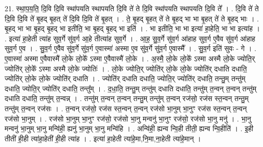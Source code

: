 \documentclass[17pt]{extarticle}
\begin{document}
21. स्था॒प॒य॒ति॒ दि॒वि दि॒वि स्था॑पयति स्थापयति दि॒वि ते॑ ते दि॒वि स्था॑पयति स्थापयति दि॒वि ते᳚ । . दि॒वि ते॑ ते दि॒वि दि॒वि ते॑ बृ॒हद् बृ॒हत् ते॑ दि॒वि दि॒वि ते॑ बृ॒हत् । . ते॒ बृ॒हद् बृ॒हत् ते॑ ते बृ॒हद् भा भा बृ॒हत् ते॑ ते बृ॒हद् भाः । . बृ॒हद् भा भा बृ॒हद् बृ॒हद् भा इतीति॒ भा बृ॒हद् बृ॒हद् भा इति॑ । . भा इतीति॒ भा भा इत्या॑ हा॒हेति॒ भा भा इत्या॑ह । . इत्या॑ हा॒हेती त्या॑ह सुव॒र्गे सु॑व॒र्ग आ॒हे तीत्या॑ह सुव॒र्गे । . आ॒ह॒ सु॒व॒र्गे सु॑व॒र्ग आ॑हाह सुव॒र्ग ए॒वैव सु॑व॒र्ग आ॑हाह सुव॒र्ग ए॒व । . सु॒व॒र्ग ए॒वैव सु॑व॒र्गे सु॑व॒र्ग ए॒वास्मा॑ अस्मा ए॒व सु॑व॒र्गे सु॑व॒र्ग ए॒वास्मै᳚ । . सु॒व॒र्ग इति॑ सुवः - गे । . ए॒वास्मा॑ अस्मा ए॒वैवास्मै॑ लो॒के लो॒के᳚ ऽस्मा ए॒वैवास्मै॑ लो॒के । . अ॒स्मै॒ लो॒के लो॒के᳚ ऽस्मा अस्मै लो॒के ज्योति॒र् ज्योति॑र् लो॒के᳚ ऽस्मा अस्मै लो॒के ज्योतिः॑ । . लो॒के ज्योति॒र् ज्योति॑र् लो॒के लो॒के ज्योति॑र् दधाति दधाति॒ ज्योति॑र् लो॒के लो॒के ज्योति॑र् दधाति । . ज्योति॑र् दधाति दधाति॒ ज्योति॒र् ज्योति॑र् दधाति॒ तन्तु॒म् तन्तु॑म् दधाति॒ ज्योति॒र् ज्योति॑र् दधाति॒ तन्तु᳚म् । . द॒धा॒ति॒ तन्तु॒म् तन्तु॑म् दधाति दधाति॒ तन्तु॑म् त॒न्वन् त॒न्वन् तन्तु॑म् दधाति दधाति॒ तन्तु॑म् त॒न्वन्न् । . तन्तु॑म् त॒न्वन् त॒न्वन् तन्तु॒म् तन्तु॑म् त॒न्वन् रज॑सो॒ रज॑स स्त॒न्वन् तन्तु॒म् तन्तु॑म् त॒न्वन् रज॑सः । . त॒न्वन् रज॑सो॒ रज॑स स्त॒न्वन् त॒न्वन् रज॑सो भा॒नुम् भा॒नुꣳ रज॑स स्त॒न्वन् त॒न्वन् रज॑सो भा॒नुम् । . रज॑सो भा॒नुम् भा॒नुꣳ रज॑सो॒ रज॑सो भा॒नु मन्वनु॑ भा॒नुꣳ रज॑सो॒ रज॑सो भा॒नु मनु॑ । . भा॒नु मन्वनु॑ भा॒नुम् भा॒नु मन्वि॑ही॒ ह्यनु॑ भा॒नुम् भा॒नु मन्वि॑हि । . अन्वि॑ही॒ ह्यन्व न्वि॒ही तीती॒ ह्यन्व न्वि॒हीति॑ । . इ॒ही तीती॑ ही॒ही त्या॑हा॒हेती॑ ही॒ही त्या॑ह । . इत्या॑ हा॒हेती त्या॑हे॒मा,नि॒मा,ना॒हेती त्या॑हे॒मान् । \newline
\end{document}
